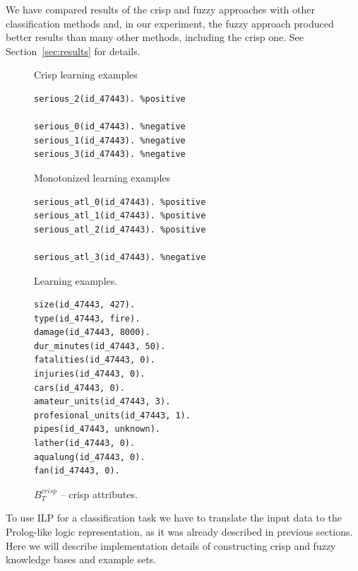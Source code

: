 We have compared results of the crisp and fuzzy approaches with other classification methods and, in our experiment, the fuzzy approach produced better results than many other methods, including the crisp one. See Section~\ref{sec:results} for details.



\begin{figure}
\begin{minipage}[b]{0.5\hsize}
	Crisp learning examples\\
\begin{verbatim}
serious_2(id_47443). %positive

serious_0(id_47443). %negative
serious_1(id_47443). %negative
serious_3(id_47443). %negative							
\end{verbatim}						
	Monotonized learning examples\\
\begin{verbatim}
serious_atl_0(id_47443). %positive
serious_atl_1(id_47443). %positive
serious_atl_2(id_47443). %positive

serious_atl_3(id_47443). %negative					
\end{verbatim}						
	\caption{Learning examples.}
	\label{img:examples}
\end{minipage}
\hspace{0.5cm}
\begin{minipage}[b]{0.5\hsize}
\begin{verbatim}
size(id_47443, 427).
type(id_47443, fire).
damage(id_47443, 8000).
dur_minutes(id_47443, 50).
fatalities(id_47443, 0).
injuries(id_47443, 0).
cars(id_47443, 0).
amateur_units(id_47443, 3).
profesional_units(id_47443, 1).
pipes(id_47443, unknown).
lather(id_47443, 0).
aqualung(id_47443, 0).
fan(id_47443, 0).
\end{verbatim}						
	\caption{$B^{crisp}_{T}$ -- crisp attributes.}
	\label{img:crisp_attributes}
\end{minipage}
\end{figure}






To use ILP for a classification task we have to translate the input data to the Prolog-like logic representation, as it was already described in previous sections. Here we will describe implementation details of constructing crisp and fuzzy knowledge bases and example sets.

